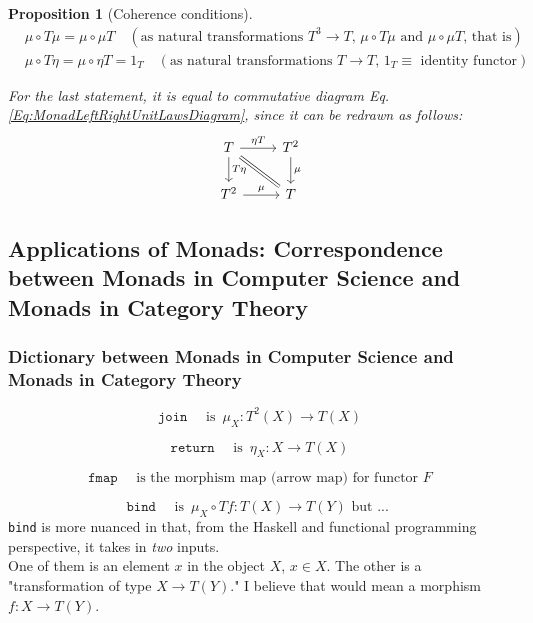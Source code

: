 \documentclass[10pt]{amsart}
\newtheorem{proposition}{Proposition}
\begin{document}
\begin{multicols*}{2}
\begin{proposition}[Coherence conditions]\label{Prop:MonadCoherenceConditions}
	\begin{equation}
	\begin{aligned}
	& \mu \circ T \mu = \mu \circ \mu T \quad (\text{as natural transformations $T^3 \to T$, $\mu \circ T\mu$ and $\mu \circ \mu T$, that is}) \\ 
	& \mu \circ T \eta = \mu \circ \eta T = 1_T \quad (\text{as natural transformations $T \to T$, $1_T \equiv$ identity functor}) 
	\end{aligned}
	\end{equation}
	
	For the last statement, it is equal to commutative diagram Eq. \ref{Eq:MonadLeftRightUnitLawsDiagram}, since it can be redrawn as follows:
\[
\begin{tikzcd}
	T \arrow{d}{ T \eta} \arrow{r}{\eta T} \arrow[equal]{dr} & T^2 \arrow{d}{\mu} \\
	T^2 \arrow{r}{\mu} & T
\end{tikzcd}	
\]
	
\end{proposition}

\subsection{Applications of Monads: Correspondence between Monads in Computer Science and Monads in Category Theory}

\subsubsection{Dictionary between Monads in Computer Science and Monads in Category Theory}

\[
\boxed{ \texttt{join} \quad \text{ is } \, \mu_X : T^2(X) \to T(X)}
\]

\[
\boxed{ \texttt{return} \quad \text{ is } \, \eta_X: X \to T(X) }
\]

\[
\boxed{ \texttt{fmap} \quad \text{ is the morphism map (arrow map) for functor } F}
\]

\[
\boxed{ \texttt{bind} \quad \text{ is } \, \mu_X \circ Tf : T(X) \to T(Y) \text{ but ... }}
\]
\texttt{bind} is more nuanced in that, from the Haskell and functional programming perspective, it takes in \emph{two} inputs. \\

One of them is an element $x$ in the object $X$, $x \in X$. The other is a "transformation of type $X \to T(Y)$." I believe that would mean a morphism $f: X \to T(Y)$.  \\


\end{multicols*}
\end{document}
